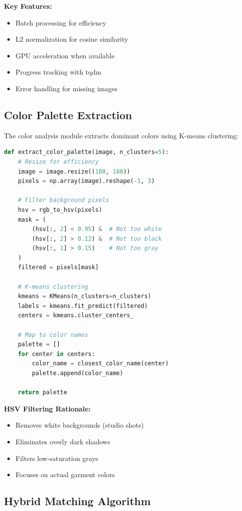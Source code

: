 \documentclass[12pt,a4paper]{report}
\begin{document}
\textbf{Key Features:}
\begin{itemize}
    \item Batch processing for efficiency
    \item L2 normalization for cosine similarity
    \item GPU acceleration when available
    \item Progress tracking with tqdm
    \item Error handling for missing images
\end{itemize}

\subsection{Color Palette Extraction}

The color analysis module extracts dominant colors using K-means clustering:

\begin{lstlisting}[language=Python]
def extract_color_palette(image, n_clusters=5):
    # Resize for efficiency
    image = image.resize((180, 180))
    pixels = np.array(image).reshape(-1, 3)
    
    # Filter background pixels
    hsv = rgb_to_hsv(pixels)
    mask = (
        (hsv[:, 2] < 0.95) &  # Not too white
        (hsv[:, 2] > 0.12) &  # Not too black
        (hsv[:, 1] > 0.15)    # Not too gray
    )
    filtered = pixels[mask]
    
    # K-means clustering
    kmeans = KMeans(n_clusters=n_clusters)
    labels = kmeans.fit_predict(filtered)
    centers = kmeans.cluster_centers_
    
    # Map to color names
    palette = []
    for center in centers:
        color_name = closest_color_name(center)
        palette.append(color_name)
    
    return palette
\end{lstlisting}

\textbf{HSV Filtering Rationale:}
\begin{itemize}
    \item Removes white backgrounds (studio shots)
    \item Eliminates overly dark shadows
    \item Filters low-saturation grays
    \item Focuses on actual garment colors
\end{itemize}

\subsection{Hybrid Matching Algorithm}
\end{document}
